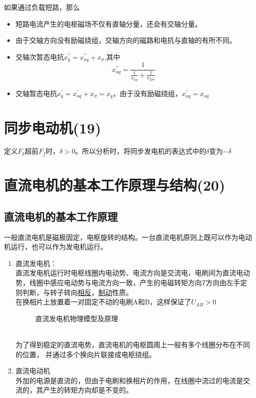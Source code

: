 \documentclass[blue]{elegantnote}
\begin{document}
如果{\color{blue}通过负载短路}，那么
	\begin{itemize}
		\item 短路电流产生的电枢磁场不仅有直轴分量，还会有交轴分量。
		\item 由于交轴方向没有励磁绕组，交轴方向的磁路和电抗与直轴的有所不同。
		\item 交轴次暂态电抗$x_q^{''}=x_{aq}^{''}+x_{\sigma}$,其中
		$$x_{aq}^{''}=\frac{1}{\frac{1}{x_{aq}}+\frac{1}{x_{D\sigma}}}$$
		\item 交轴暂态电抗$x_q^{'}=x_{aq}^{'}+x_{\sigma}=x_q$，由于没有励磁绕组，$x_{aq}^{'}=x_{aq}$
	\end{itemize}

\chapter{同步电动机(19)}
定义$F_{\delta}$超前$F_{f}$时，$\delta>0$。所以分析时，将同步发电机的表达式中的$\delta$变为$-\delta$

\chapter{直流电机的基本工作原理与结构(20)} 
\section{直流电机的基本工作原理}
\indent 一般直流电机是磁极固定，{\color{thid}电枢旋转}的结构。{\color{thid}一台直流电机原则上既可以作为电动机运行，也可以作为发电机运行。}
\begin{enumerate}
	\item 直流发电机：\\
	直流发电机运行时电枢线圈内电动势、电流方向是交流电，电刷间为直流电动势，线圈中感应电动势与电流方向一致，产生的电磁转矩方向$T$方向由左手定则判断，与转子转向\underline{相反}，\underline{制动}性质。
	\\{\color{red}在换相片上放置着一对固定不动的电刷A和B，这样保证了$U_{AB}>0$}
		\begin{figure}[!hbtp]
			\centering
			\caption{直流发电机物理模型及原理}      
		\end{figure}
		\\为了得到稳定的直流电势，直流电机的电枢圆周上一般有多个线圈分布在不同的位置，
		并通过多个换向片联接成电枢绕组。
	\item 直流电动机\\
		外加的电源是直流的，但由于电刷和换相片的作用，在线圈中流过的电流是交流的，其产生的转矩方向却是不变的。
\end{enumerate}
\end{document}
